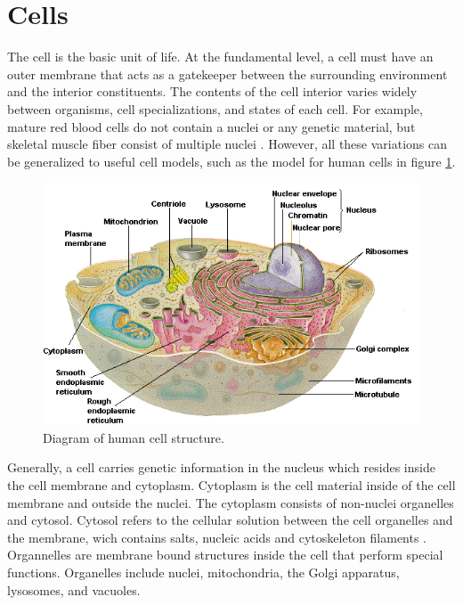 

\section{Cells}
\par The cell is the basic unit of life. At the fundamental level, a cell must have an outer membrane that acts as a gatekeeper between the surrounding environment and the interior constituents. The contents of the cell interior varies widely between organisms, cell specializations, and states of each cell. For example, mature red blood cells do not contain a nuclei or any genetic material, but skeletal muscle fiber consist of multiple nuclei \cite{daniel_d_chiras_human_2005}. However, all these variations can be generalized to useful cell models, such as the model for human cells in figure \ref{fig:human_cell_model}.   
\begin{figure}[ht]
 \centering
 \includegraphics[width=\textwidth]{images/humanCellOverview.png}
 \caption[Diagram of human cell structure.]{Diagram of human cell structure. \cite{daniel_d_chiras_human_2005} }
 \label{fig:human_cell_model}
 \end{figure}
 
 \par Generally, a cell carries genetic information in the nucleus which resides inside the cell membrane and cytoplasm. Cytoplasm is the cell material inside of the cell membrane and outside the nuclei. The cytoplasm consists of non-nuclei organelles and cytosol.  Cytosol refers to the cellular solution between the cell organelles and the membrane, wich contains salts, nucleic acids and cytoskeleton filaments \cite{daniel_d_chiras_human_2005}. Organnelles are membrane bound structures inside the cell that perform special functions. Organelles include nuclei, mitochondria, the Golgi apparatus, lysosomes, and vacuoles.  
 
